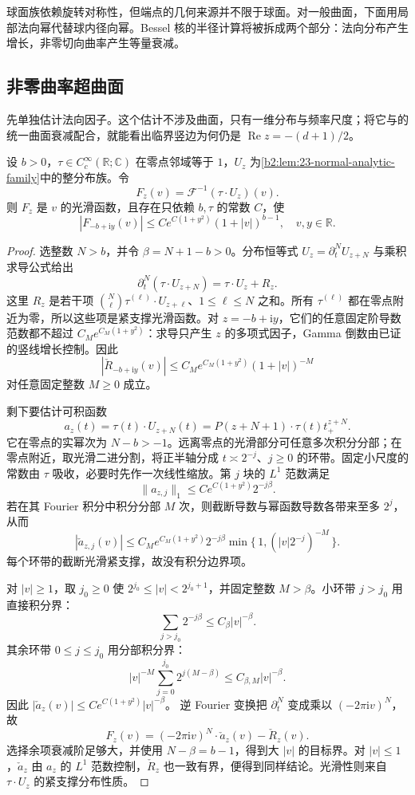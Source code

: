 \ProseParagraphBreak
球面族依赖旋转对称性，但端点的几何来源并不限于球面。对一般曲面，下面用局部法向幂代替球内径向幂。Bessel 核的半径计算将被拆成两个部分：法向分布产生增长，非零切向曲率产生等量衰减。

\subsection{非零曲率超曲面}
\label{b2:subsec:230404}

先单独估计法向因子。这个估计不涉及曲面，只有一维分布与频率尺度；将它与的统一曲面衰减配合，就能看出临界竖边为何仍是 \(\operatorname{Re}z=-(d+1)/2\)。

\begin{lemma}[截断法向幂的核增长]\label{b2:lem:23-normal-kernel-growth}
设 \(b>0\)，\(\tau\in C_c^\infty(\mathbb R;\mathbb C)\) 在零点邻域等于 \(1\)，\(U_z\) 为\cref{b2:lem:23-normal-analytic-family}中的整分布族。令
\[
 F_z(v)=\mathcal F^{-1}(\tau\cdot U_z)(v).
\]
则 \(F_z\) 是 \(v\) 的光滑函数，且存在只依赖 \(b,\tau\) 的常数 \(C\)，使
\[
 |F_{-b+\mathrm iy}(v)|
 \leq C e^{C(1+y^2)}(1+|v|)^{b-1},
 \quad v,y\in\mathbb R.
\]
\end{lemma}
\begin{proof}
选整数 \(N>b\)，并令 \(\beta=N+1-b>0\)。分布恒等式
\(U_z=\partial_t^NU_{z+N}\) 与乘积求导公式给出
\[
 \partial_t^N(\tau\cdot U_{z+N})
 =\tau\cdot U_z+R_z.
\]
这里 \(R_z\) 是若干项
\(\binom N\ell\tau^{(\ell)}\cdot U_{z+\ell}\)、\(1\leq\ell\leq N\)
之和。所有 \(\tau^{(\ell)}\) 都在零点附近为零，所以这些项是紧支撑光滑函数。对 \(z=-b+\mathrm iy\)，它们的任意固定阶导数范数都不超过 \(C_M e^{C_M(1+y^2)}\)：求导只产生 \(z\) 的多项式因子，Gamma 倒数由已证的竖线增长控制。因此
\[
 |\check R_{-b+\mathrm iy}(v)|
 \leq C_M e^{C_M(1+y^2)}(1+|v|)^{-M}
\]
对任意固定整数 \(M\geq0\) 成立。

剩下要估计可积函数
\[
 a_z(t)=\tau(t)\cdot U_{z+N}(t)
 =P(z+N+1)\cdot\tau(t)t_+^{z+N}.
\]
它在零点的实幂次为 \(N-b>-1\)。远离零点的光滑部分可任意多次积分分部；在零点附近，取光滑二进分割，将正半轴分成 \(t\asymp2^{-j}\)、\(j\geq0\) 的环带。固定小尺度的常数由 \(\tau\) 吸收，必要时先作一次线性缩放。第 \(j\) 块的 \(L^1\) 范数满足
\[
 \|a_{z,j}\|_1\leq C e^{C(1+y^2)}2^{-j\beta}.
\]
若在其 Fourier 积分中积分分部 \(M\) 次，则截断导数与幂函数导数各带来至多 \(2^j\)，从而
\[
 |\check a_{z,j}(v)|
 \leq C_M e^{C_M(1+y^2)}2^{-j\beta}
 \min\{\,1,(|v|2^{-j})^{-M}\,\}.
\]
每个环带的截断光滑紧支撑，故没有积分边界项。

对 \(|v|\geq1\)，取 \(j_0\geq0\) 使
\(2^{j_0}\leq|v|<2^{j_0+1}\)，并固定整数 \(M>\beta\)。小环带 \(j>j_0\) 用直接积分界：
\[
 \sum_{j>j_0}2^{-j\beta}\leq C_\beta|v|^{-\beta}.
\]
其余环带 \(0\leq j\leq j_0\) 用分部积分界：
\[
 |v|^{-M}\sum_{j=0}^{j_0}2^{j(M-\beta)}
 \leq C_{\beta,M}|v|^{-\beta}.
\]
因此 \(|\check a_z(v)|\leq C e^{C(1+y^2)}|v|^{-\beta}\)。
逆 Fourier 变换把 \(\partial_t^N\) 变成乘以 \((-2\pi\mathrm iv)^N\)，故
\[
 F_z(v)=(-2\pi\mathrm iv)^N\cdot\check a_z(v)-\check R_z(v).
\]
选择余项衰减阶足够大，并使用 \(N-\beta=b-1\)，得到大 \(|v|\) 的目标界。对 \(|v|\leq1\)，\(\check a_z\) 由 \(a_z\) 的 \(L^1\) 范数控制，\(\check R_z\) 也一致有界，便得到同样结论。光滑性则来自 \(\tau\cdot U_z\) 的紧支撑分布性质。
\end{proof}

